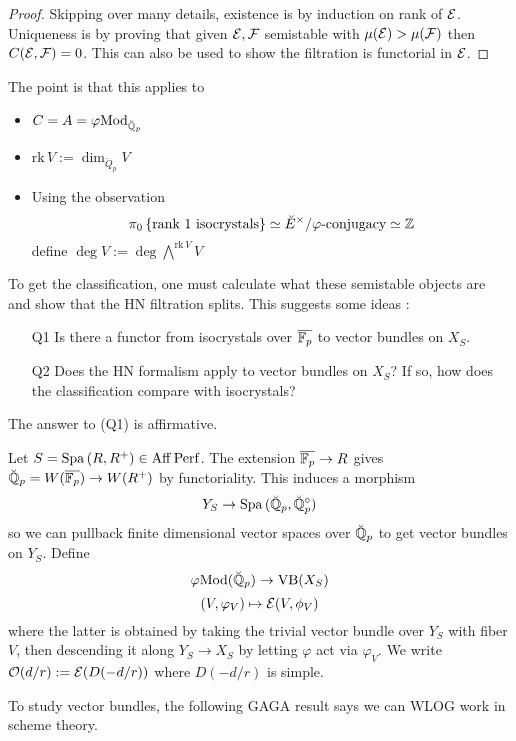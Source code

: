 \documentclass{article}
\begin{document}
\begin{proof}
  Skipping over many details, existence is by induction on rank of $\mathcal{E}$.
  Uniqueness is by proving that given $\mathcal{E}, \mathcal{F}$ semistable
  with $\mu(\mathcal{E}) > \mu(\mathcal{F})$ then $C(\mathcal{E} , \mathcal{F}) = 0$.
  This can also be used to show the filtration is functorial in $\mathcal{E}$.
\end{proof}
The point is that this applies to 
\begin{itemize}
  \item $C = A = \varphi\mathrm{Mod}_{\breve{\mathbb{Q}}_p}$
  \item $\mathrm{rk}\,V:= \dim_{\breve{Q}_p} V$
  \item Using the observation \[
    \pi_0 \left\{\text{rank 1 isocrystals}\right\} \simeq
    {\breve{E}}^\times / \varphi\text{-conjugacy} \simeq \mathbb{Z}
  \]
  define $\deg V := \deg \bigwedge^{\mathrm{rk}\,V} V$
\end{itemize}
To get the classification,
one must calculate what these semistable objects are
and show that the HN filtration splits.
This suggests some ideas : 
\begin{enumerate}
  \item [Q1] Is there a functor from
  isocrystals over $\overline{\mathbb{F}_p}$ to vector bundles on $X_S$.
  \item [Q2] Does the HN formalism apply to vector bundles on $X_S$?
  If so, how does the classification compare with isocrystals?
\end{enumerate}
The answer to (Q1) is affirmative.
\begin{dfn}
  
  Let $S = \mathrm{Spa}\,(R , R^+) \in \mathrm{Aff}\operatorname{Perf}$.
  The extension $\overline{\mathbb{F}_p} \to R$ gives
  $\breve{\mathbb{Q}}_p = W(\overline{\mathbb{F}_p}) \to W(R^+)$ by functoriality.
  This induces a morphism \[
    Y_{S} \to \mathrm{Spa}\, (\breve{\mathbb{Q}}_p , \breve{\mathbb{Q}}_p^\circ)
  \]
  so we can pullback finite dimensional vector spaces over $\breve{\mathbb{Q}}_p$
  to get vector bundles on $Y_{S}$.
  Define \[
    \varphi\mathrm{Mod}(\breve{\mathbb{Q}}_p) \to \mathrm{VB}(X_{S})
  \]
  \[
    (V , \varphi_V) \mapsto \mathcal{E}(V , \phi_V)
  \]
  where the latter is 
  obtained by taking the trivial vector bundle over $Y_{S}$ with fiber $V$,
  then descending it along $Y_{S} \to X_{S}$ by letting
  $\varphi$ act via $\varphi_V$.
  We write $\mathcal{O}(d / r) := \mathcal{E}({D(- d / r)})$ where $D( - d / r)$ is simple.
\end{dfn}
To study vector bundles,
the following GAGA result says we can WLOG work in scheme theory.
\end{document}
